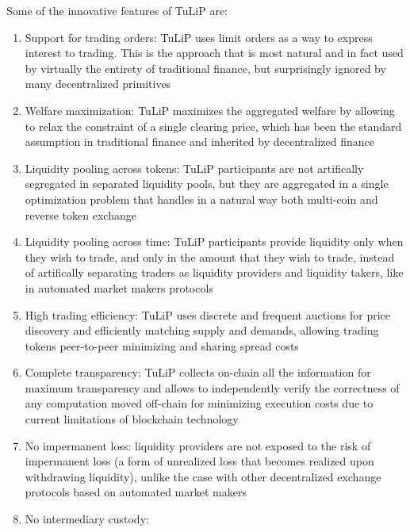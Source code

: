 \documentclass[11pt, reqno]{amsart}
\theoremstyle{definition}
\theoremstyle{remark}
\begin{document}
Some of the innovative features of TuLiP are:
\begin{enumerate}
    \item Support for trading orders:
          TuLiP uses limit orders as a way to express interest to trading. This
          is the approach that is most natural and in fact used by virtually
          the entirety of traditional finance, but surprisingly ignored by many
          decentralized primitives
    \item Welfare maximization:
          TuLiP maximizes the aggregated welfare by allowing to relax the
          constraint of a single clearing price, which has been the standard
          assumption in traditional finance and inherited by decentralized
          finance
    \item Liquidity pooling across tokens:
          TuLiP participants are not artifically segregated in separated liquidity
          pools, but they are aggregated in a single optimization problem that
          handles in a natural way both multi-coin and reverse token exchange
	\item Liquidity pooling across time:
          TuLiP participants provide liquidity only when they wish to trade, and only
          in the amount that they wish to trade, instead of artifically
          separating traders as liquidity providers and liquidity takers, like
          in automated market makers protocols
	\item High trading efficiency:
          TuLiP uses discrete and frequent auctions for price discovery and
          efficiently matching supply and demands, allowing trading tokens
          peer-to-peer minimizing and sharing spread costs
    \item Complete transparency:
          TuLiP collects on-chain all the information for maximum transparency
          and allows to independently verify the correctness of any computation
          moved off-chain for minimizing execution costs due to current limitations
          of blockchain technology
	\item No impermanent loss:
	      liquidity providers are not exposed to the risk of impermanent loss
	      (a form of unrealized loss that becomes realized upon withdrawing
	      liquidity), unlike the case with other decentralized exchange protocols
	      based on automated market makers
	\item No intermediary custody:

\end{enumerate}
\end{document}
